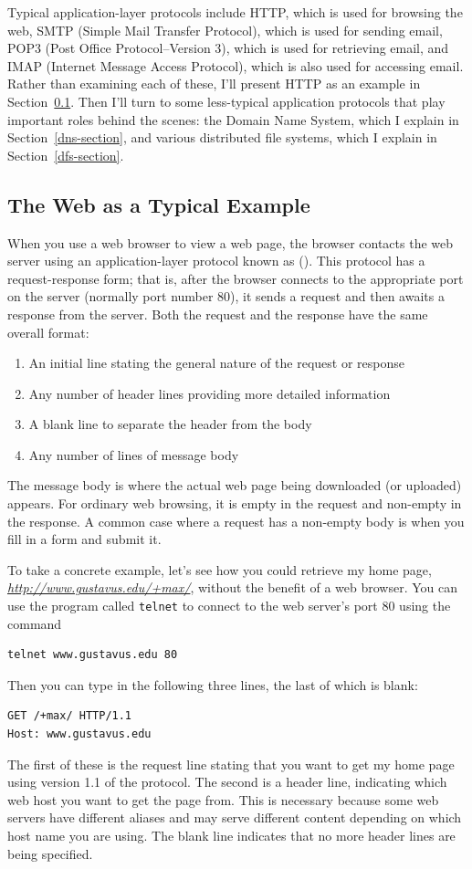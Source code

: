 Typical application-layer protocols include HTTP, which is used for
browsing the web, SMTP (Simple Mail Transfer Protocol), which is used
for sending email, POP3 (Post Office Protocol--Version 3), which
is used for retrieving email, and IMAP (Internet Message Access Protocol), which is also used for
accessing email.  Rather than examining each of these, I'll present
HTTP as an example in Section~\ref{http-section}.  Then I'll turn to
some less-typical application protocols that play important roles
behind the scenes: the Domain Name System, which I explain in
Section~\ref{dns-section}, and various distributed file systems, which
I explain in Section~\ref{dfs-section}.

\subsection{The Web as a Typical Example}\label{http-section}

When you use a web browser to view a web page, the browser contacts the web
server using an application-layer protocol known as 
().  This protocol has a
request-response form; that is, after the browser connects to the
appropriate port on the server (normally port number 80), it sends a
request and then awaits a response from the server.  Both the request
and the response have the same overall format:
\begin{enumerate}
\item An initial line stating
the general nature of the request or response
\item Any number of header
lines providing more detailed information
\item A blank line to separate the header from the body
\item Any
number of lines of message body
\end{enumerate}
The message body is where the actual web page being downloaded (or
uploaded) appears.  For ordinary web browsing, it is empty in the request and
non-empty in the response.  A common case where a request has a
non-empty body is when you fill in a form and submit it.

To take a concrete example, let's see how you could retrieve my home
page, \textit{\url{http://www.gustavus.edu/+max/}}, without the benefit of a web
browser.  You can use the program called \verb|telnet| to connect to the
web server's port 80 using the command
\begin{verbatim}
telnet www.gustavus.edu 80
\end{verbatim}
Then you can type in the following three lines, the last of which is blank:
\begin{verbatim}
GET /+max/ HTTP/1.1
Host: www.gustavus.edu

\end{verbatim}
The first of these is the request line stating that you want to get my
home page using version 1.1 of the protocol.  The second is a header
line, indicating which web host you want to get the page from.  This
is necessary because some web servers have different aliases and may
serve different content depending on which host name you are using.
The blank line indicates that no more header lines are being
specified.

